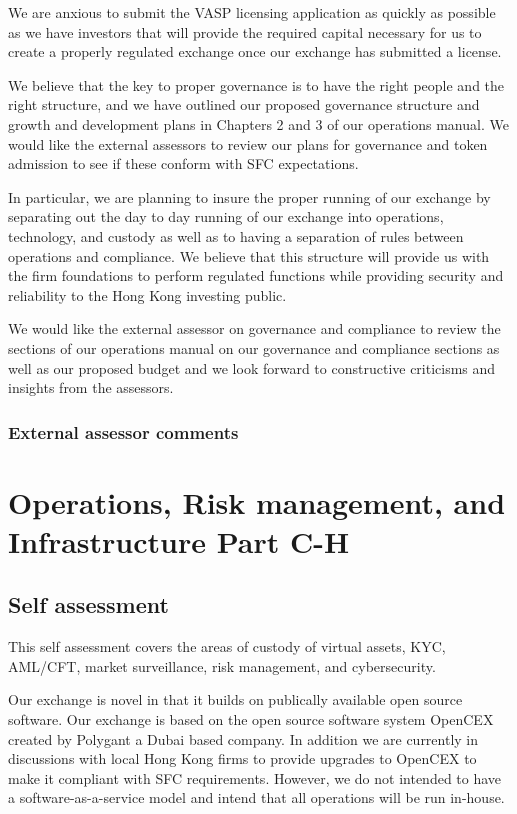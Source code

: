 \documentclass[]{report}
\begin{document}
We are anxious to submit the VASP licensing application as quickly as
possible as we have investors that will provide the required capital
necessary for us to create a properly regulated exchange once our
exchange has submitted a license.

We believe that the key to proper governance is to have the right
people and the right structure, and we have outlined our proposed
governance structure and growth and development plans in Chapters 2
and 3 of our operations manual.  We would like the external assessors
to review our plans for governance and token admission to see if these
conform with SFC expectations.

In particular, we are planning to insure the proper running of our
exchange by separating out the day to day running of our exchange into
operations, technology, and custody as well as to having a separation
of rules between operations and compliance.  We believe that this
structure will provide us with the firm foundations to perform
regulated functions while providing security and reliability to the
Hong Kong investing public.

We would like the external assessor on governance and compliance to
review the sections of our operations manual on our governance and
compliance sections as well as our proposed budget and we look forward
to constructive criticisms and insights from the assessors.

\subsection{External assessor comments}

\chapter{Operations, Risk management, and Infrastructure Part C-H}

\section{Self assessment}

This self assessment covers the areas of custody of virtual assets,
KYC, AML/CFT, market surveillance, risk management, and cybersecurity.

Our exchange is novel in that it builds on publically available open
source software.  Our exchange is based on the open source software
system OpenCEX created by Polygant a Dubai based company.  In addition
we are currently in discussions with local Hong Kong firms to provide
upgrades to OpenCEX to make it compliant with SFC requirements.
However, we do not intended to have a software-as-a-service model and
intend that all operations will be run in-house.
\end{document}

